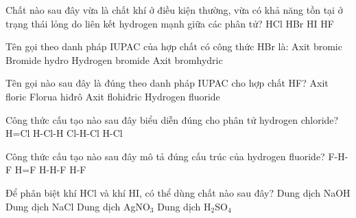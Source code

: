 \documentclass[Main.tex]{subfiles}
\begin{document}
    \begin{ex}
    Chất nào sau đây vừa là chất khí ở điều kiện thường, vừa có khả năng tồn tại ở trạng thái lỏng do liên kết hydrogen mạnh giữa các phân tử?
    \choice
    {HCl}
    {HBr}
    {HI}
    {\True HF}
    \end{ex}
    
    \begin{ex}
    Tên gọi theo danh pháp IUPAC của hợp chất có công thức HBr là:
    \choice
    {Axit bromic}
    {Bromide hydro}
    {\True Hydrogen bromide}
    {Axit bromhydric}
    \end{ex}
    
    \begin{ex}
    Tên gọi nào sau đây là đúng theo danh pháp IUPAC cho hợp chất HF?
    \choice
    {Axit floric}
    {Florua hiđrô}
    {Axit flohiđric}
    {\True Hydrogen fluoride}
    \end{ex}
    
    \begin{ex}
    Công thức cấu tạo nào sau đây biểu diễn đúng cho phân tử hydrogen chloride?
    \choice
    {H=Cl}
    {H-Cl-H}
    {Cl-H-Cl}
    {\True H-Cl}
    \end{ex}
    
    \begin{ex}
    Công thức cấu tạo nào sau đây mô tả đúng cấu trúc của hydrogen fluoride?
    \choice
    {F-H-F}
    {H=F}
    {H-H-F}
    {\True H-F}
    \end{ex}
    
    \begin{ex}
    Để phân biệt khí HCl và khí HI, có thể dùng chất nào sau đây?
    \choice
    {Dung dịch NaOH}
    {Dung dịch NaCl}
    {\True Dung dịch AgNO$_3$}
    {Dung dịch H$_2$SO$_4$}
    \end{ex}
    
\end{document}
